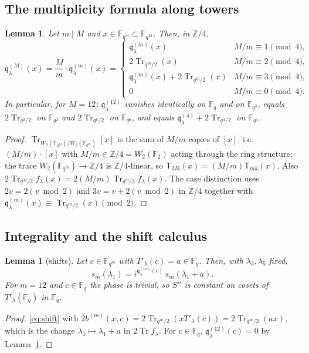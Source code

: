 \documentclass[12pt,a4paper]{amsart}
\newtheorem{lemma}[theorem]{Lemma}
\theoremstyle{definition}
\newcommand{\F}{\mathbb{F}}
\newcommand{\Z}{\mathbb{Z}}
\newcommand{\Tr}{\operatorname{Tr}}
\newcommand{\qq}{\mathfrak{q}}
\newcommand{\Spp}{S''}
\begin{document}
\subsection{The multiplicity formula along towers}
\begin{lemma}\label{lem:multiplicity}
Let $m\mid M$ and $x\in\F_{q^m}\subset\F_{q^M}$. Then, in $\Z/4$,
\[
\qq^{(M)}_\lambda(x)=\frac Mm\cdot\qq^{(m)}_\lambda(x)=
\begin{cases}
\qq^{(m)}_\lambda(x)&M/m\equiv1\pmod4,\\
2\Tr_{q^m/2}(x)&M/m\equiv2\pmod4,\\
\qq^{(m)}_\lambda(x)+2\Tr_{q^m/2}(x)&M/m\equiv3\pmod4,\\
0&M/m\equiv0\pmod4.
\end{cases}
\]
In particular, for $M=12$: $\qq^{(12)}_\lambda$ vanishes identically on $\F_q$ and on $\F_{q^3}$, equals $2\Tr_{q^2/2}$ on $\F_{q^2}$ and $2\Tr_{q^6/2}$ on $\F_{q^6}$, and equals $\qq^{(4)}_\lambda+2\Tr_{q^4/2}$ on $\F_{q^4}$.
\end{lemma}
\begin{proof}
$\Tr_{W_2(\F_{q^M})/W_2(\F_{q^m})}[x]$ is the sum of $M/m$ copies of $[x]$, i.e.\ $(M/m)\cdot[x]$ with $M/m\in\Z/4=W_2(\F_2)$ acting through the ring structure; the trace $W_2(\F_{q^m})\to\Z/4$ is $\Z/4$-linear, so $\mathsf T_{Mk}(x)=(M/m)\mathsf T_{mk}(x)$. Also $2\Tr_{q^M/2}f_\lambda(x)=2(M/m)\Tr_{q^m/2}f_\lambda(x)$. The case distinction uses $2v=2(v\bmod2)$ and $3v=v+2(v\bmod2)$ in $\Z/4$ together with $\qq^{(m)}_\lambda(x)\equiv\Tr_{q^m/2}(x)\pmod2$.
\end{proof}

\subsection{Integrality and the shift calculus}
\begin{lemma}[shifts]\label{lem:wittshift}
Let $c\in\F_{q^m}$ with $T'_\lambda(c)=a\in\F_q$. Then, with $\lambda_3,\lambda_5$ fixed,
\[
s_m(\lambda_1)=i^{\qq^{(m)}_\lambda(c)}\,s_m(\lambda_1+a).
\]
For $m=12$ and $c\in\F_q$ the phase is trivial, so $\Spp$ is constant on cosets of $T'_\lambda(\F_q)$ in $\F_q$.
\end{lemma}
\begin{proof}
\eqref{eq:shift} with $2b^{(m)}(x,c)=2\Tr_{q^m/2}(xT'_\lambda(c))=2\Tr_{q^m/2}(ax)$, which is the change $\lambda_1\mapsto\lambda_1+a$ in $2\Tr f_\lambda$. For $c\in\F_q$, $\qq^{(12)}_\lambda(c)=0$ by Lemma~\ref{lem:multiplicity}.
\end{proof}
\end{document}
